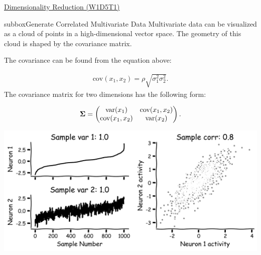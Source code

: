 \begin{textbox}{\href{https://compneuro.neuromatch.io/tutorials/W1D5_DimensionalityReduction/student/W1D5_Tutorial1.html}{Dimensionality Reduction (W1D5T1)} }
\begin{subbox}{subbox}{Generate Correlated Multivariate Data}
\scriptsize
 Multivariate data can be visualized as a cloud of points in a high-dimensional vector space. The geometry of this cloud is shaped by the covariance matrix.

The covariance can be found from the equation above:

\begin{align}
\text{cov}(x_1,x_2) = \rho \sqrt{\sigma_1^2 \sigma_2^2}.
\end{align}
The covariance matrix for two dimensions has the following form:

\begin{align}
{\bf \Sigma} = 
\begin{pmatrix}
 \text{var}(x_1) & \text{cov}(x_1,x_2) \\
 \text{cov}(x_1,x_2) &\text{var}(x_2)
\end{pmatrix}.
\end{align}

\centering
\includegraphics[scale=0.15]{Figures/DM/DMFigure1.png}
\end{subbox}


\end{textbox}
